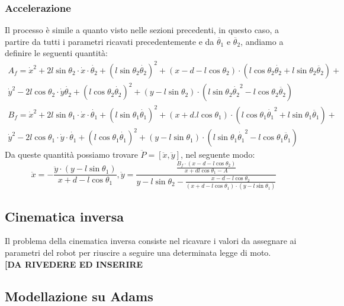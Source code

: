 \subsubsection{Accelerazione}
Il processo è simile a quanto visto nelle sezioni precedenti, in questo caso, a partire da tutti i parametri ricavati precedentemente e da $\ddot{\theta_1}$ e $\ddot{\theta_2}$, andiamo a definire le seguenti quantità:
\begin{equation*}
\begin{aligned}
    A_{f} = \dot{x}^2 + 2l\sin\theta_2\cdot\dot{x}\cdot\dot{\theta_2}+(l\sin\theta_2\dot{\theta_2})^2 + (x-d-l\cos\theta_2)\cdot(l\cos\theta_2\dot{\theta_2}+l\sin\theta_2\ddot{\theta_2}) +\\ \dot{y}^2-2l\cos\theta_2\cdot\dot{y}\dot{\theta_2}+(l\cos\theta_2\dot{\theta_2})^2+(y-l\sin\theta_2)\cdot(l\sin\theta_2\dot{\theta_2}^2-l\cos\theta_2\ddot{\theta_2})
    \end{aligned}
\end{equation*}
\begin{equation*}
    \begin{aligned}
    B_{f} = \dot{x}^2+2l\sin\theta_1\cdot\dot{x}\cdot\dot{\theta_1} + (l\sin\theta_1\dot{\theta_1})^2+(x+d.l\cos\theta_1)\cdot(l\cos\theta_1\dot{\theta_1}^2+l\sin\theta_1\ddot{\theta_1})+
    \\ \dot{y}^2 -2l\cos\theta_1\cdot \dot{y}\cdot\dot{\theta_1}+(l\cos\theta_1\dot{\theta_1})^2+(y-l\sin\theta_1)\cdot(l\sin\theta_1\dot{\theta_1}^2-l\cos\theta_1\ddot{\theta_1})
    \end{aligned}
\end{equation*}
Da queste quantità possiamo trovare $\ddot{P} = [\ddot{x},\ddot{y}]$, nel seguente modo:
\begin{equation}
    \ddot{x} = -\frac{\ddot{y}\cdot(y-l\sin\theta_1)}{x+d-l\cos\theta_1}, \ddot{y} = \frac{\frac{B_{f}\cdot(x-d-l\cos\theta_2)}{x+dl\cos\theta_1-A}}{y-l\sin\theta_2-\frac{x-d-l\cos\theta_2}{(x+d-l\cos\theta_1)\cdot(y-l\sin\theta_1)}}
\end{equation}
\subsection{Cinematica inversa}
Il problema della cinematica inversa consiste nel ricavare i valori da assegnare ai parametri del robot per riuscire a seguire una determinata legge di moto.
\\\textbf{[DA RIVEDERE ED INSERIRE}
\subsection{Modellazione su Adams}